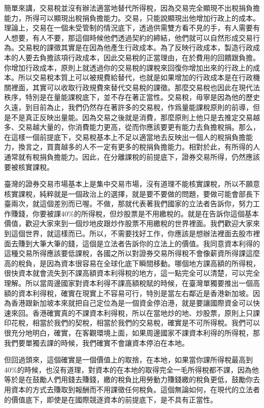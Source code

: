 \documentclass[oneside,sub3section]{ctexbook}
\begin{document}
簡單來講，交易稅並沒有辦法適當地替代所得稅，因為交易完全顯現不出稅捐負擔能力，所得可以顯現出稅捐負擔能力。交易，只能說顯現出他增加行政上的成本。理論上，交易在一個未受管制的情況底下，透過供需雙方看不見的手，有人需要有人想要，有人不要，那這個時候他們透過契約的締結，他們就可以自然形成交易行為。交易稅的課徵其實是在因為他產生行政成本。為了反映行政成本，製造行政成本的人要去負擔該項行政成本，因此交易稅的正當理由，在於費用的回饋跟負擔。你增加行政成本，原則上就透過你的交易稅的課稅來回復你增加出來的行政上的成本。所以交易稅本質上可以被規費給替代，也就是如果增加的行政成本是在行政機關裡面，其實可以收取行政規費來替代交易稅的課徵。那麼交易稅也因此在現代法秩序，特別是在量能課稅底下，並不存在著正當性。交易稅，毋寧是因為他的歷史久遠，到目前為止，我們仍然存在著許多的交易稅，作爲量能課稅原則的前導，但是不是真正反映出量能。因為交易之後就是消費，那麼原則上他只是去推定交易越多、交易越大量的，你消費能力更高，從而你應該要更有能力去負擔稅捐。那么，在這樣一個前提底下，交易稅基本上不足以適當地去反映出一個人的稅捐負擔能力，換言之，買賣越多的人不一定有更多的稅捐負擔能力。相對於此，有所得的人通常就有稅捐負擔能力。因此，在分離課稅的前提底下，證券交易所得，仍然應該要被核實課稅。

臺灣的證券交易市場基本上是集中交易市場，沒有道理不能核實課稅，所以不願意核實課稅，純粹就是一個政治上的選擇，就是要不要做的問題，要做可能會部長下臺兩次，就這個差別而已喔。不做，那就代表著我們國家的立法者告訴你，努力工作賺錢，你要被課40\%的所得稅，但炒股票是不用繳稅的。就是在告訴你這個基本價值，歡迎大家來到一個炒地皮跟炒作股票不用繳稅的世界裡面。我們歡迎大家來到這個世界，就這樣而已。所以，不需要找好工作，你應該是想辦法裡面去股市裡面去賺到大筆大筆的錢，這個是立法者告訴你的立法上的價值。我同意資本利得的這種交易所得應該要低課稅，各國之所以對證券交易所得稅不會像薪資所得課這麼高的稅負，是因為資本很容易在全球化底下瞬間移動。哪個地方課高額的所得稅，很快資本就會流失到不課高額資本利得稅的地方，這一點完全可以清楚，可以完全理解。所以當周邊國家對資本利得不課高額稅賦的時候，在臺灣單獨要推出一個高額的資本利得稅，確實在現實上不容易可行，特別是當左右鄰近是香港新加坡。因為香港跟新加坡本來就把自己定位為是一個資金停泊港，就是要讓國際資金可以快速來回。香港確實真的不課資本利得稅，所以在當地炒的地、炒股票，原則上只課印花稅，相當於我們的契稅，相當於我們的交易稅，確實是不可所得稅。我們可以很充分地明白，確實，在客觀環境上面，如果周邊國家不課資本利得的所得稅，那我們要單獨去課的時候，我們確實不會讓資本停泊在本地。

但回過頭來，這個確實是一個價值上的取捨，在本地，如果當你課所得稅最高到40\%的時候，也沒有道理，對資本的在本地的取得完全一毛所得稅都不課，因為他等於是在鼓勵人們用錢去賺錢，繳的稅負比用勞動力賺錢繳的稅負更低，鼓勵你去用資本的方式去賺取到報酬而不用課徵任何稅負。這個無論如何，在現代的立法者的價值底下，即使是在國際競逐資本的前提底下，是不具有正當性。
\end{document}
